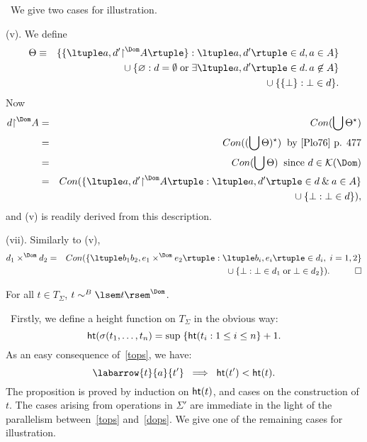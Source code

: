\proof\ We give two cases for illustration.

\noindent (v). We define
\begin{eqnarray*}
\Theta & \equiv & \{ \{ \ltuple a, d' {\restriction}^{\Dom} A \rtuple \} : \ltuple a, d' \rtuple \in d, a \in A \} \\
&  & \mbox{} \cup \{ \varnothing : d = \emptyset \; \mbox{or} \; \exists \ltuple a, d' \rtuple \in d. \, a \not\in A \} \\
&  & \mbox{} \cup \{ \{ \bot \} : \bot \in d \} .
\end{eqnarray*}
Now
\begin{eqnarray*}
d {\restriction}^{\Dom} A & = & Con( \bigcup \Theta^{\star})  \\
& = & Con((\bigcup \Theta )^{\star}) \;\; \mbox{by \cite{Plo76} p. 477} \\
& = & Con(\bigcup \Theta ) \;\; \mbox{since $d \in {\cal K}(\Dom )$} \\
& = & Con( \{ \ltuple a, d' {\restriction}^{\Dom} A \rtuple : \ltuple a, d' \rtuple \in d \: \& \: a \in A \} \\
&   & \mbox{} \cup \{ \bot : \bot \in d \} ), 
\end{eqnarray*}
and (v) is readily derived from this description.

\noindent (vii). Similarly to (v),
\begin{eqnarray*}
d_{1} \times^{\Dom} d_{2} & = & Con( \{ \ltuple b_{1}b_{2}, e_{1} \times^{\Dom} e_{2} \rtuple : \ltuple b_{i}, e_{i} \rtuple \in d_{i}, \; i = 1, 2 \} \\
& & \mbox{} \cup \{ \bot : \bot \in d_{1} \; \mbox{or} \; \bot \in d_{2} \} ). \;\;\; \qed
\end{eqnarray*}

\begin{proposition}
\label{sbis}
For all $t \in T_{\Sigma}$, $t \sim^{B} \lsem t \rsem^{\Dom}$.
\end{proposition}

\proof\ Firstly, we define a height function on $T_{\Sigma}$ in the obvious way:
\[ {\sf ht}( \sigma (t_{1}, \ldots , t_{n}) = \sup \; \{ {\sf ht}(t_{i} : 1 \leq i \leq n \} + 1 . \]
As an easy consequence of~\ref{tops}, we have:
\[ \labarrow{t}{a}{t'} \;\; \Longrightarrow \;\; {\sf ht}(t' ) < {\sf ht}(t) . \]
The proposition is proved by induction on ${\sf ht}(t)$, and cases on the construction of $t$.
The cases arising from operations in $\Sigma'$ are immediate in the light of the parallelism between~\ref{tops} and~\ref{dops}.
We give one of the remaining cases for illustration.

